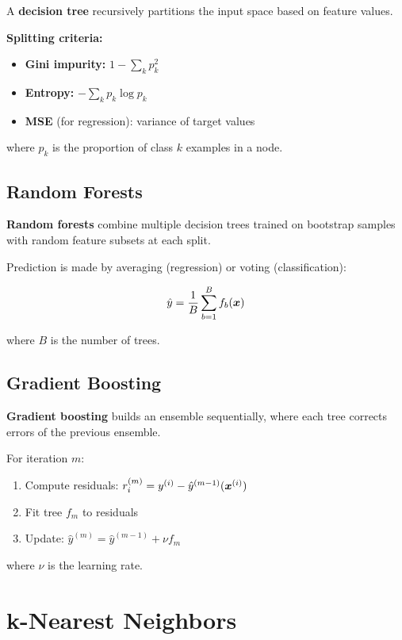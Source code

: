 A \textbf{decision tree} recursively partitions the input space based on feature values.

\textbf{Splitting criteria:}
\begin{itemize}
    \item \textbf{Gini impurity:} $1 - \sum_{k} p_k^2$
    \item \textbf{Entropy:} $-\sum_{k} p_k \log p_k$
    \item \textbf{MSE} (for regression): variance of target values
\end{itemize}

where $p_k$ is the proportion of class $k$ examples in a node.

\subsection{Random Forests}

\textbf{Random forests} combine multiple decision trees trained on bootstrap samples with random feature subsets at each split.

Prediction is made by averaging (regression) or voting (classification):

\begin{equation}
\hat{y} = \frac{1}{B} \sum_{b=1}^{B} f_b(\boldsymbol{x})
\end{equation}

where $B$ is the number of trees.

\subsection{Gradient Boosting}

\textbf{Gradient boosting} builds an ensemble sequentially, where each tree corrects errors of the previous ensemble.

For iteration $m$:
\begin{enumerate}
    \item Compute residuals: $r_i^{(m)} = y^{(i)} - \hat{y}^{(m-1)}(\boldsymbol{x}^{(i)})$
    \item Fit tree $f_m$ to residuals
    \item Update: $\hat{y}^{(m)} = \hat{y}^{(m-1)} + \nu f_m$
\end{enumerate}

where $\nu$ is the learning rate.

\section{k-Nearest Neighbors}
\label{sec:knn}

